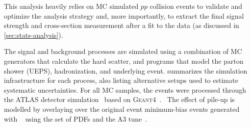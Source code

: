 This analysis heavily relies on MC simulated $pp$ collision events to validate and optimize the analysis strategy and, more importantly, to extract the final signal strength and cross-section measurement after a fit to the data (as discussed in \cref{sec:stats-analysis}).

The signal and background processes are simulated using a combination of MC generators that calculate the hard scatter, and programs that model the parton shower (UEPS), hadronization, and underlying event.
 summarizes the simulation infrastructure for each process, also listing alternative setups used to estimate systematic uncertainties.
For all MC samples, the events were processed through the ATLAS detector simulation~\cite{SOFT-2010-01} based on \textsc{Geant4}~\cite{Agostinelli:2002hh}.~\cite{HWWPaper}
The effect of pile-up is modelled by overlaying over the original event minimum-bias events generated with ~\cite{Sjostrand:2007gs} using the \nnpdftwo set of PDFs and the A3 tune~\cite{ATL-PHYS-PUB-2016-017}.

